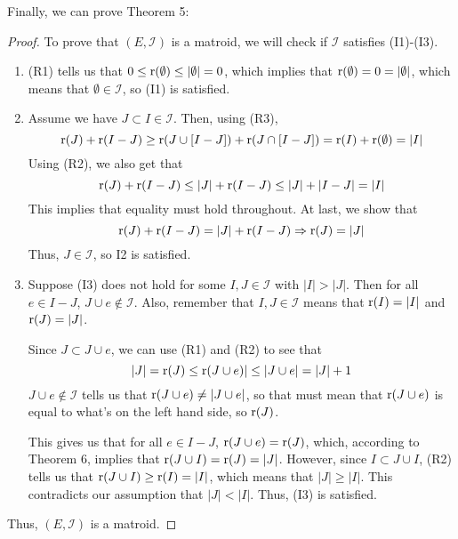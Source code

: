 Finally, we can prove Theorem 5:
\begin{proof}
    To prove that $(E,\mathcal{I})$ is a matroid, we will check if $\mathcal{I}$ satisfies (I1)-(I3).
    \begin{enumerate}
        \item (R1) tells us that $0\leq\text{r}(\emptyset)\leq|\emptyset|=0$, which implies that $\text{r}(\emptyset)=0=|\emptyset|$, which means that $\emptyset\in\mathcal{I}$, so (I1) is satisfied.
        \item Assume we have $J\subset I\in\mathcal{I}$. Then, using (R3),
        $$ \text{r}(J)+\text{r}(I-J) \geq \text{r}(J\cup[I-J])+\text{r}(J\cap[I-J]) = \text{r}(I)+\text{r}(\emptyset)=|I| $$
        Using (R2), we also get that
        $$ \text{r}(J)+\text{r}(I-J) \leq |J|+\text{r}(I-J) \leq |J|+|I-J| = |I| $$
        This implies that equality must hold throughout. At last, we show that
        $$ \text{r}(J)+\text{r}(I-J) = |J|+\text{r}(I-J) \Rightarrow \text{r}(J)=|J| $$
        Thus, $J\in\mathcal{I}$, so {I2} is satisfied.
        
        \item Suppose (I3) does not hold for some $I,J\in\mathcal{I}$ with $|I|>|J|$. Then for all $e\in I-J$, $J\cup e\notin \mathcal{I}$. Also, remember that $I,J\in\mathcal{I}$ means that $\text{r}(I)=|I|$ and $\text{r}(J)=|J|$.

        Since $J\subset J\cup e$, we can use (R1) and (R2) to see that
        $$ |J|=\text{r}(J)\leq\text{r}(J\cup e)|\leq|J\cup e|=|J|+1 $$
        $J\cup e\notin \mathcal{I}$ tells us that $\text{r}(J\cup e)\neq|J\cup e|$, so that must mean that $\text{r}(J\cup e)$ is equal to what's on the left hand side, so $\text{r}(J)$.

        This gives us that for all $e\in I-J$, $\text{r}(J\cup e)=\text{r}(J)$, which, according to Theorem 6, implies that $\text{r}(J\cup I)=\text{r}(J)=|J|$. However, since $I\subset J\cup I$, (R2) tells us that $\text{r}(J\cup I) \geq \text{r}(I) = |I|$, which means that $|J|\geq|I|$. This contradicts our assumption that $|J|<|I|$. Thus, (I3) is satisfied.
    \end{enumerate}
    Thus, $(E,\mathcal{I})$ is a matroid.
\end{proof}




